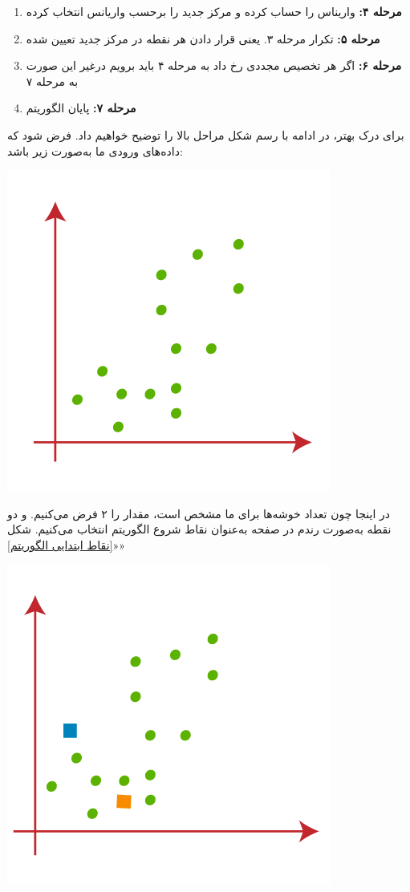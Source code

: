 \begin{enumerate}
\begin{qsolve}
\begin{enumerate}
	\item \textbf{مرحله ۴:} واریناس را حساب کرده و مرکز جدید را برحسب واریانس انتخاب کرده
	
	\item \textbf{مرحله ۵:} تکرار مرحله ۳. یعنی قرار دادن هر نقطه در مرکز جدید تعیین شده
	
	\item \textbf{مرحله ۶:} اگر هر تخصیص مجددی رخ داد به مرحله ۴ باید برویم درغیر این صورت به مرحله ۷
	
	\item \textbf{مرحله ۷:} پایان الگوریتم
\end{enumerate}

برای درک بهتر، در ادامه با رسم شکل مراحل بالا را توضیح خواهیم داد. فرض شود که داده‌های ورودی ما به‌صورت زیر باشد:

\begin{center}
	\includegraphics*[width=0.5\linewidth]{pics/img3.png}
	\label{داده‌های ورودی}
\end{center}

در اینجا چون تعداد خوشه‌ها برای ما مشخص است، مقدار  را ۲ فرض می‌کنیم. و دو نقطه به‌صورت رندم در صفحه به‌عنوان نقاط شروع الگوریتم انتخاب می‌کنیم. شکل «\ref{نقاط ابتدایی الگوریتم}»

\end{qsolve}
	
	
	
	
	
\begin{qsolve}
	\begin{center}
		\includegraphics*[width=0.5\linewidth]{pics/img4.png}
		\label{نقاط ابتدایی الگوریتم}
	\end{center}
	

\end{qsolve}
\end{enumerate}
